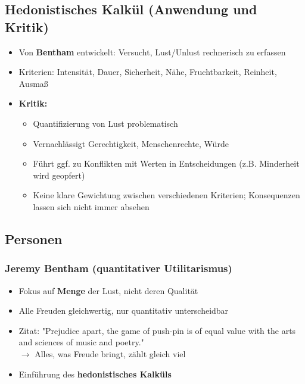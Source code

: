 \subsection{Hedonistisches Kalkül (Anwendung und Kritik)}
\begin{itemize}
    \item Von \textbf{Bentham} entwickelt: Versucht, Lust/Unlust rechnerisch zu erfassen
    \item Kriterien: Intensität, Dauer, Sicherheit, Nähe, Fruchtbarkeit, Reinheit, Ausmaß
    \item \textbf{Kritik:}
    \begin{itemize}
        \item Quantifizierung von Lust problematisch
        \item Vernachlässigt Gerechtigkeit, Menschenrechte, Würde
        \item Führt ggf. zu Konflikten mit Werten in Entscheidungen (z.B. Minderheit wird geopfert)
        \item Keine klare Gewichtung zwischen verschiedenen Kriterien; Konsequenzen lassen sich nicht immer absehen
    \end{itemize}
\end{itemize}


\subsection{Personen}


\subsubsection{Jeremy Bentham (quantitativer Utilitarismus)}

\begin{itemize}
    \item Fokus auf \textbf{Menge} der Lust, nicht deren Qualität
    \item Alle Freuden gleichwertig, nur quantitativ unterscheidbar
    \item Zitat: "Prejudice apart, the game of push-pin is of equal value with the arts and sciences of music and poetry." \\
        $\rightarrow$ Alles, was Freude bringt, zählt gleich viel
    \item Einführung des \textbf{hedonistisches Kalküls}
\end{itemize}


